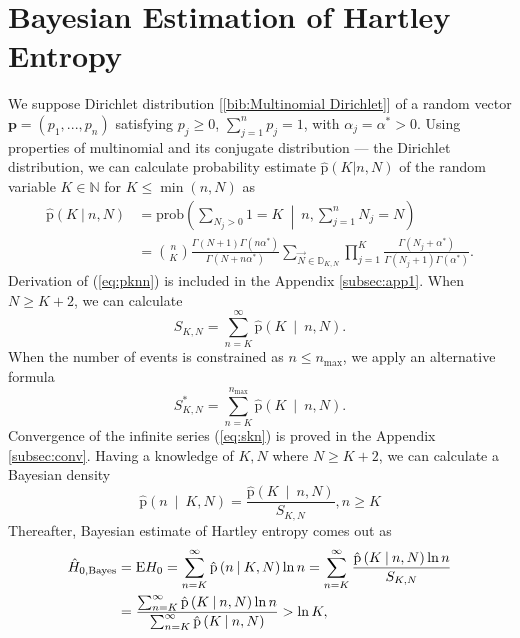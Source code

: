 \section {Bayesian Estimation of Hartley Entropy}
We suppose Dirichlet distribution [\ref{bib:Multinomial Dirichlet}] of a random vector $\mathbf{p} = (p_{1},...,p_{n})$ satisfying  $p_{j} \ge 0$, $\sum_{j=1}^{n} p_{j} = 1$, with $\alpha_j = \alpha^{*} > 0$. Using properties of multinomial and its conjugate distribution --- the Dirichlet distribution, we can calculate probability estimate $\mathrm{\hat{p}}(K|n,N)$ of the random variable $K \in \mathbb{N}$ for $K \le \min(n,N)$ as 
\begin{equation} 
\label{eq:pknn}
\begin{split}
\mathrm{\hat{p}}(K \: | \: n,N) & = \text{prob}\left(\sum_{N_{j} > 0}{1}=K \: \middle| \: n,\sum_{j=1}^{n}{N_{j}}=N\right) \\ 
& = \binom{n}{K} \frac{\Gamma({N+1}) \Gamma(n\alpha^{*})}{\Gamma(N+n\alpha^{*})} \sum_{\vec{N} \in \mathbb{D}_{K,N}} \prod_{j=1}^{K} \frac{ \Gamma(N_{j} + \alpha^{*})}{ \Gamma(N_j+1) \Gamma(\alpha^{*})}.
\end{split}
\end{equation}
Derivation of (\ref{eq:pknn}) is included in the Appendix \ref{subsec:app1}. When $N \ge K+2$, we can calculate 
\begin{equation} 
\label{eq:skn}
S_{K,N} = \sum_{n=K}^{\infty}{\mathrm{\hat{p}}\left(K \: \middle| \: n,N\right)}.
\end{equation}
When the number of events is constrained as $n \leq n_{\text{max}} $, we apply an alternative formula
\begin{equation} 
\label{eq:sknalt}
S_{K,N}^{*} = \sum_{n=K}^{n_{\text{max}}}{\mathrm{\hat{p}}\left(K \: \middle| \: n,N\right)}.
\end{equation}
Convergence of the infinite series (\ref{eq:skn}) is proved in the Appendix \ref{subsec:conv}. Having a knowledge of $K,N$ where $N \ge K+2$, we can calculate a Bayesian density
\begin{equation} 
\label{eq:pnkn}
\mathrm{\hat{p}}\left(n \: \middle| \: K,N \right) = \frac{\mathrm{\hat{p}}\left(K \: \middle| \: n,N\right)}{S_{K,N}}, n \ge K
\end{equation}
Thereafter, Bayesian estimate of Hartley entropy comes out as
\begin{equation} 
\label{eq:hnbayes}
\begin{split}
\hat{H}_{0,\mbox{\scriptsize{Bayes}}} & = \text{E}H_{0}  = \sum_{n=K}^{\infty}{\mathrm{\hat{p}}\left(n \: \middle| \: K,N\right)\ln{n}} = \sum_{n=K}^{\infty} \frac{\mathrm{\hat{p}}\left(K \: \middle| \: n,N\right)\ln{n}}{S_{K,N}}  \\
 & =  \frac{ \sum_{n=K}^{\infty} \mathrm{\hat{p}}\left(K \: \middle| \: n,N\right)\ln{n}}{\sum_{n=K}^{\infty} \mathrm{\hat{p}}\left(K \: \middle| \: n,N\right)} > \ln{K},
\end{split}
\end{equation}
